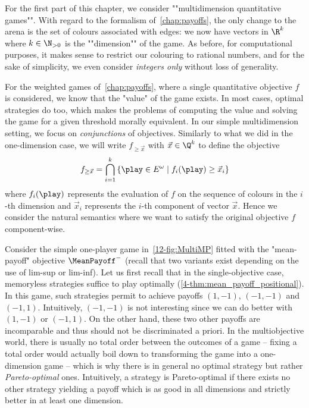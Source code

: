 For the first part of this chapter, we consider ""multidimension quantitative games"". With regard to the formalism of~\cref{chap:payoffs}, the only change to the arena is the set of colours associated with edges: we now have vectors in $\R^k$ where $k \in \N_{>0}$ is the ""dimension"" of the game. As before, for computational purposes, it makes sense to restrict our colouring to rational numbers, and for the sake of simplicity, we even consider \emph{integers only} without loss of generality.

For the weighted games of~\cref{chap:payoffs}, where a single quantitative objective $f$ is considered, we know that the "value" of the game exists. In most cases, optimal strategies do too, which makes the problems of computing the value and solving the game for a given threshold morally equivalent. In our simple multidimension setting, we focus on \emph{conjunctions} of objectives. Similarly to what we did in the one-dimension case, we will write $f_{\geq \vec{x}}$ with $\vec{x} \in \Q^k$ to define the objective
\[
f_{\geq \vec{x}} = \bigcap_{i = 1}^{k} \left\lbrace \play \in E^\omega \mid f_i(\play) \geq \vec{x}_i\right\rbrace 
\]
where $f_i(\play)$ represents the evaluation of $f$ on the sequence of colours in the $i$-th dimension and $\vec{x}_i$ represents the $i$-th component of vector $\vec{x}$. Hence we consider the natural semantics where we want to satisfy the original objective $f$ component-wise.

\begin{example}
\label{12-ex:MMP}
Consider the simple one-player game in~\cref{12-fig:MultiMP} fitted with the "mean-payoff" objective $\MeanPayoff^-$  (recall that two variants exist depending on the use of lim-sup or lim-inf).  Let us first recall that in the single-objective case, memoryless strategies suffice to play optimally (\cref{4-thm:mean_payoff_positional}). In this game, such strategies permit to achieve payoffs $(1,-1)$, $(-1,-1)$ and $(-1,1)$. Intuitively, $(-1,-1)$ is not interesting since we can do better with $(1,-1)$ or $(-1,1)$. On the other hand, these two other payoffs are incomparable and thus should not be discriminated a priori. In the multiobjective world, there is usually no total order between the outcomes of a game -- fixing a total order would actually boil down to transforming the game into a one-dimension game -- which is why there is in general no optimal strategy but rather \emph{Pareto-optimal} ones. Intuitively, a strategy is Pareto-optimal if there exists no other strategy yielding a payoff which is as good in all dimensions and strictly better in at least one dimension.
\end{example}

